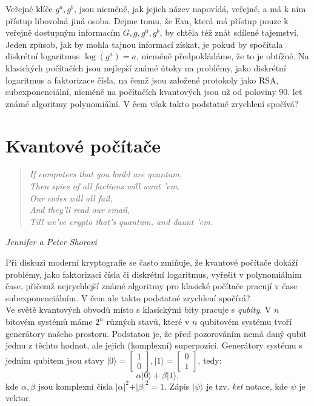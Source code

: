 \documentclass [12pt]{report}
\begin{document}
Veřejné klíče $g^a,g^b$, jsou nicméně, jak jejich název napovídá, veřejné, a má k nim přístup libovolná jiná osoba. Dejme tomu, že Eva, která má přístup pouze k veřejně dostupným informacím $G,g,g^a,g^b$, by chtěla též znát sdílené tajemství. Jeden způsob, jak by mohla tajnou informací získat, je pokud by spočítala diskrétní logaritmus $\log(g^a) = a$, nicméně předpokládáme, že to je obtížné. Na klasických počítačích jsou nejlepší známé útoky na problémy, jako diskrétní logaritmus a faktorizace čísla, na čemž jsou založené protokoly jako RSA, subexponenciální, nicméně na počítačích kvantových jsou už od poloviny $90$. let známé algoritmy polynomiální. V čem však takto podstatné zrychlení spočívá?

\section{Kvantové počítače}
\begin{center}
\begin{verse}
\qquad \textit{If computers that you build are quantum,}\\
\qquad \textit{Then spies of all factions will want 'em.}\\
\qquad \textit{Our codes will all fail,}\\
\qquad \textit{And they'll read our email,}\\
\qquad \textit{Till we've crypto that's quantum, and daunt 'em. }
\end{verse}
\hfill \textit{Jennifer a Peter Shorovi}
\end{center}

Při diskuzi moderní kryptografie se často zmiňuje, že kvantové počítače dokáží problémy, jako faktorizaci čísla či diskrétní logaritmus, vyřešit v polynomiálním čase, přičemž nejrychlejší známé algoritmy pro klasické počítače pracují v čase subexponenciálním.  V čem ale takto podstatné zrychlení spočívá?\\

Ve světě kvantových obvodů místo s klasickými bity pracuje s \textit{qubity}. V $n$ bitovém systémů máme $2^n$ různých stavů, které v $n$ qubitovém systému tvoří generátory našeho prostoru. Podstatou je, že před pozorováním nemá daný qubit jednu z těchto hodnot, ale jejich (komplexní) superpozici. Generátory systému s jedním qubitem jsou stavy $\vert 0 \rangle = \begin{bmatrix}
1 \\
0
\end{bmatrix}, \vert 1 \rangle = \begin{bmatrix}
0 \\
1
\end{bmatrix}$, tedy:
\begin{equation*}
\alpha \vert 0 \rangle + \beta \vert 1 \rangle,
\end{equation*}
kde $\alpha, \beta$ jsou komplexní čísla $\vert \alpha \vert ^2 + \vert \beta \vert ^2 = 1$. Zápis $\vert \psi \rangle$ je tzv. \textit{ket} notace, kde $\psi$ je vektor.\\
\end{document}
